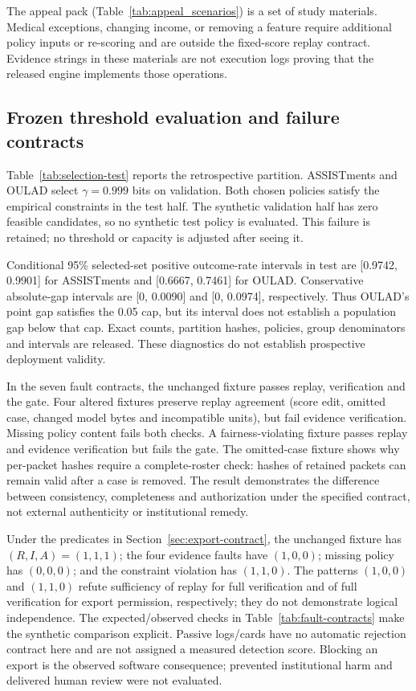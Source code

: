 The appeal pack (Table~\ref{tab:appeal_scenarios}) is a set of study materials. Medical exceptions, changing income, or removing a feature require additional policy inputs or re-scoring and are outside the fixed-score replay contract. Evidence strings in these materials are not execution logs proving that the released engine implements those operations.


\subsection{Frozen threshold evaluation and failure contracts}
Table~\ref{tab:selection-test} reports the retrospective partition. ASSISTments and OULAD select $\gamma=0.999$ bits on validation. Both chosen policies satisfy the empirical constraints in the test half. The synthetic validation half has zero feasible candidates, so no synthetic test policy is evaluated. This failure is retained; no threshold or capacity is adjusted after seeing it.

Conditional 95\% selected-set positive outcome-rate intervals in test are [0.9742, 0.9901] for ASSISTments and [0.6667, 0.7461] for OULAD. Conservative absolute-gap intervals are [0, 0.0090] and [0, 0.0974], respectively. Thus OULAD's point gap satisfies the 0.05 cap, but its interval does not establish a population gap below that cap. Exact counts, partition hashes, policies, group denominators and intervals are released. These diagnostics do not establish prospective deployment validity.


In the seven fault contracts, the unchanged fixture passes replay, verification and the gate. Four altered fixtures preserve replay agreement (score edit, omitted case, changed model bytes and incompatible units), but fail evidence verification. Missing policy content fails both checks. A fairness-violating fixture passes replay and evidence verification but fails the gate. The omitted-case fixture shows why per-packet hashes require a complete-roster check: hashes of retained packets can remain valid after a case is removed. The result demonstrates the difference between consistency, completeness and authorization under the specified contract, not external authenticity or institutional remedy.

Under the predicates in Section~\ref{sec:export-contract}, the unchanged fixture has $(R,I,A)=(1,1,1)$; the four evidence faults have $(1,0,0)$; missing policy has $(0,0,0)$; and the constraint violation has $(1,1,0)$. The patterns $(1,0,0)$ and $(1,1,0)$ refute sufficiency of replay for full verification and of full verification for export permission, respectively; they do not demonstrate logical independence. The expected/observed checks in Table~\ref{tab:fault-contracts} make the synthetic comparison explicit. Passive logs/cards have no automatic rejection contract here and are not assigned a measured detection score. Blocking an export is the observed software consequence; prevented institutional harm and delivered human review were not evaluated.

